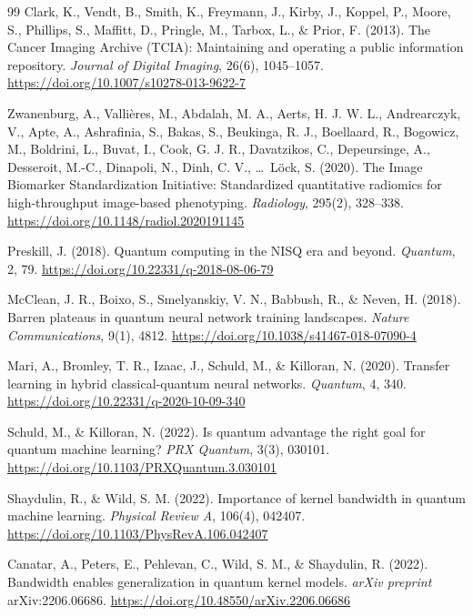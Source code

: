 \begin{thebibliography}{99}
    Clark, K., Vendt, B., Smith, K., Freymann, J., Kirby, J., Koppel, P., Moore, S., Phillips, S., Maffitt, D., Pringle, M., Tarbox, L., \& Prior, F. (2013).
    The Cancer Imaging Archive (TCIA): Maintaining and operating a public information repository.
    \textit{Journal of Digital Imaging}, 26(6), 1045--1057.
    \url{https://doi.org/10.1007/s10278-013-9622-7}

    Zwanenburg, A., Valli\`eres, M., Abdalah, M. A., Aerts, H. J. W. L., Andrearczyk, V., Apte, A., Ashrafinia, S., Bakas, S., Beukinga, R. J., Boellaard, R., Bogowicz, M., Boldrini, L., Buvat, I., Cook, G. J. R., Davatzikos, C., Depeursinge, A., Desseroit, M.-C., Dinapoli, N., Dinh, C. V., \ldots\ L\"ock, S. (2020).
    The Image Biomarker Standardization Initiative: Standardized quantitative radiomics for high-throughput image-based phenotyping.
    \textit{Radiology}, 295(2), 328--338.
    \url{https://doi.org/10.1148/radiol.2020191145}

    Preskill, J. (2018).
    Quantum computing in the NISQ era and beyond.
    \textit{Quantum}, 2, 79.
    \url{https://doi.org/10.22331/q-2018-08-06-79}

    McClean, J. R., Boixo, S., Smelyanskiy, V. N., Babbush, R., \& Neven, H. (2018).
    Barren plateaus in quantum neural network training landscapes.
    \textit{Nature Communications}, 9(1), 4812.
    \url{https://doi.org/10.1038/s41467-018-07090-4}

    Mari, A., Bromley, T. R., Izaac, J., Schuld, M., \& Killoran, N. (2020).
    Transfer learning in hybrid classical-quantum neural networks.
    \textit{Quantum}, 4, 340.
    \url{https://doi.org/10.22331/q-2020-10-09-340}

    Schuld, M., \& Killoran, N. (2022).
    Is quantum advantage the right goal for quantum machine learning?
    \textit{PRX Quantum}, 3(3), 030101.
    \url{https://doi.org/10.1103/PRXQuantum.3.030101}

    Shaydulin, R., \& Wild, S. M. (2022).
    Importance of kernel bandwidth in quantum machine learning.
    \textit{Physical Review A}, 106(4), 042407.
    \url{https://doi.org/10.1103/PhysRevA.106.042407}

    Canatar, A., Peters, E., Pehlevan, C., Wild, S. M., \& Shaydulin, R. (2022).
    Bandwidth enables generalization in quantum kernel models.
    \textit{arXiv preprint} arXiv:2206.06686.
    \url{https://doi.org/10.48550/arXiv.2206.06686}


\end{thebibliography}
